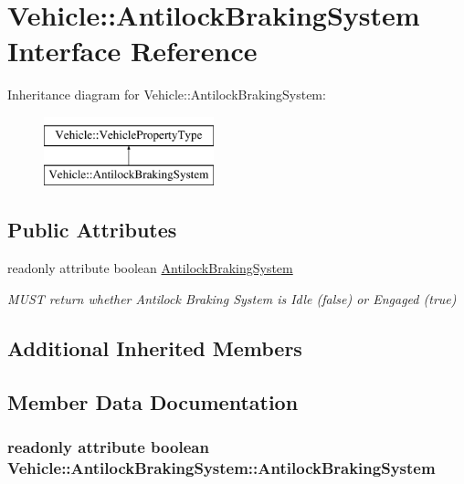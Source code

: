 \hypertarget{interfaceVehicle_1_1AntilockBrakingSystem}{\section{Vehicle\-:\-:Antilock\-Braking\-System Interface Reference}
\label{interfaceVehicle_1_1AntilockBrakingSystem}
}
Inheritance diagram for Vehicle\-:\-:Antilock\-Braking\-System\-:\begin{figure}[H]
\begin{center}
\leavevmode
\includegraphics[height=2.000000cm]{interfaceVehicle_1_1AntilockBrakingSystem}
\end{center}
\end{figure}
\subsection*{Public Attributes}
\begin{DoxyCompactItemize}
\item 
readonly attribute boolean \hyperlink{interfaceVehicle_1_1AntilockBrakingSystem_a42565118a26418aabdd2435d9d8ffb97}{Antilock\-Braking\-System}
\begin{DoxyCompactList}\small\item\em M\-U\-S\-T return whether Antilock Braking System is Idle (false) or Engaged (true) \end{DoxyCompactList}\end{DoxyCompactItemize}
\subsection*{Additional Inherited Members}


\subsection{Member Data Documentation}
\hypertarget{interfaceVehicle_1_1AntilockBrakingSystem_a42565118a26418aabdd2435d9d8ffb97}{
\subsubsection[{Antilock\-Braking\-System}]{\setlength{\rightskip}{0pt plus 5cm}readonly attribute boolean Vehicle\-::\-Antilock\-Braking\-System\-::\-Antilock\-Braking\-System}}\label{interfaceVehicle_1_1AntilockBrakingSystem_a42565118a26418aabdd2435d9d8ffb97}


